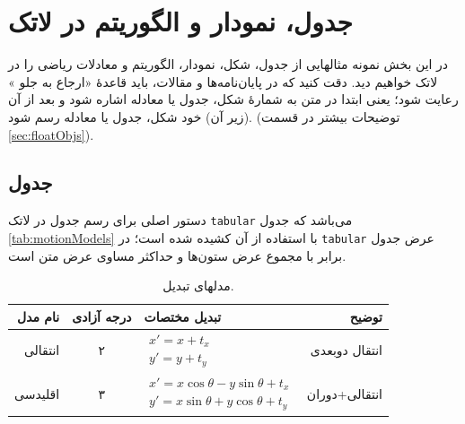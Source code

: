 
\chapter{‌جدول، نمودار و الگوریتم در لاتک}
\label{app:latex:more}

در این بخش نمونه مثالهایی از جدول، شکل، نمودار، الگوریتم و معادلات ریاضی را در لاتک خواهیم دید.
دقت کنید که در پایان‌نامه‌ها و مقالات، باید قاعدهٔ «ارجاع به جلو%
»
رعایت شود؛ یعنی ابتدا در متن به شمارهٔ شکل، جدول یا معادله اشاره شود و بعد از آن (زیر آن) خود شکل، جدول یا معادله رسم شود. (توضیحات بیشتر در قسمت
\ref{sec:floatObjs}).

\section{جدول}
دستور اصلی برای رسم جدول در لاتک 
\verb|tabular|
می‌باشد که جدول
\eqref{tab:motionModels}
با استفاده از آن کشیده شده است؛ در
\verb|tabular|
عرض جدول برابر با مجموع عرض ستون‌ها و حداکثر مساوی عرض متن است.
\begin{table}[ht]
\caption{مدلهای تبدیل.}
\label{tab:motionModels}
\centering
\onehalfspacing
\begin{tabular}{|r|c|l|r|}
	\hline نام مدل & درجه آزادی & تبدیل مختصات & توضیح \\ 
	\hline انتقالی & ۲ & $\begin{aligned} x'=x+t_x \\ y'=y+t_y \end{aligned}$  &  انتقال دوبعدی\\ 
	\hline اقلیدسی & ۳ & $\begin{aligned} x'=x\cos\theta - y\sin\theta+t_x \\ y'=x\sin\theta+y\cos\theta+t_y \end{aligned}$  &  انتقالی+دوران \\ 
	\hline 
\end{tabular} 
\end{table}

